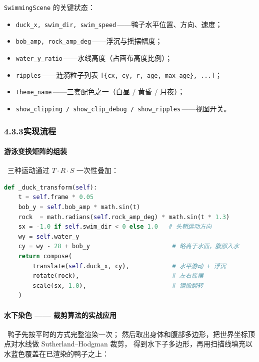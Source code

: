 \documentclass[12pt, a4paper]{article}
\begin{document}
\texttt{SwimmingScene} 的关键状态：
\begin{itemize}[leftmargin=*]
    \item \texttt{duck\_x, swim\_dir, swim\_speed}\,——鸭子水平位置、方向、速度；
    \item \texttt{bob\_amp, rock\_amp\_deg}\,——浮沉与摇摆幅度；
    \item \texttt{water\_y\_ratio}\,——水线高度（占画布高度比例）；
    \item \texttt{ripples}\,——涟漪粒子列表 \texttt{[\{cx, cy, r, age, max\_age\}, ...]}；
    \item \texttt{theme\_name}\,——三套配色之一（白昼 / 黄昏 / 月夜）；
    \item \texttt{show\_clipping / show\_clip\_debug / show\_ripples}\,——视图开关。
\end{itemize}

\subsubsection*{4.3.3\quad 实现流程}

\paragraph{游泳变换矩阵的组装}\ 三种运动通过 $T \cdot R \cdot S$ 一次性叠加：

\begin{lstlisting}[language=Python, caption={游泳变换组装（main.py 摘录）}]
def _duck_transform(self):
    t = self.frame * 0.05
    bob_y = self.bob_amp * math.sin(t)
    rock  = math.radians(self.rock_amp_deg) * math.sin(t * 1.3)
    sx = -1.0 if self.swim_dir < 0 else 1.0   # 头朝运动方向
    wy = self.water_y
    cy = wy - 28 + bob_y                       # 略高于水面，腹部入水
    return compose(
        translate(self.duck_x, cy),            # 水平游动 + 浮沉
        rotate(rock),                          # 左右摇摆
        scale(sx, 1.0),                        # 镜像翻转
    )
\end{lstlisting}

\paragraph{水下染色 —— 裁剪算法的实战应用}\ 鸭子先按平时的方式完整渲染一次；
然后取出身体和腹部多边形，把世界坐标顶点对水线做 Sutherland--Hodgman 裁剪，
得到水下子多边形，再用扫描线填充以水蓝色覆盖在已渲染的鸭子之上：
\end{document}

